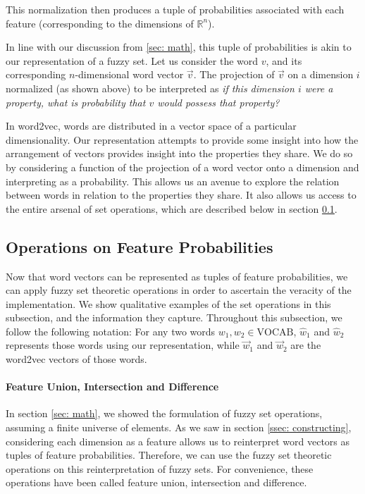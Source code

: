 \documentclass[11pt]{book}
\begin{document}
This normalization then produces a tuple of probabilities associated with each
feature (corresponding to the dimensions of $\mathbb{R}^n$). 

In line with our discussion from \ref{sec: math}, this tuple of probabilities
is akin to our representation of a fuzzy set. Let us consider the word $v$, and
its corresponding $n$-dimensional word vector $\vec v$. The projection of $\vec
v$ on a dimension $i$ normalized (as shown above) to be interpreted as
\textit{if this dimension $i$ were a property, what is probability that $v$
would possess that property?} 

In word2vec, words are distributed in a vector space of a particular
dimensionality. Our representation attempts to provide some insight into how
the arrangement of vectors provides insight into the properties they share. We
do so by considering a function of the projection of a word vector onto a
dimension and interpreting as a probability. This allows us an avenue to
explore the relation between words in relation to the properties they share. It
also allows us access to the entire arsenal of set operations, which are
described below in section \ref{ssec: set operations}.

\subsection{Operations on Feature Probabilities} \label{ssec: set operations}

Now that word vectors can be represented as tuples of feature probabilities, we
can apply fuzzy set theoretic operations in order to ascertain the veracity of
the implementation. We show qualitative examples of the set operations in this
subsection, and the information they capture. Throughout this subsection, we
follow the following notation: For any two words $w_1, w_2 \in \text{VOCAB}$,
$\hat w_1$ and $\hat w_2$ represents those words using our representation,
while $\vec w_1$ and $\vec w_2$ are the word2vec vectors of those words.

\paragraph{Feature Union, Intersection and Difference} In section \ref{sec:
math}, we showed the formulation of fuzzy set operations, assuming a finite
universe of elements. As we saw in section \ref{ssec: constructing},
considering each dimension as a feature allows us to reinterpret word vectors
as tuples of feature probabilities. Therefore, we can use the fuzzy set
theoretic operations on this reinterpretation of fuzzy sets. For convenience,
these operations have been called feature union, intersection and difference. 
\end{document}
